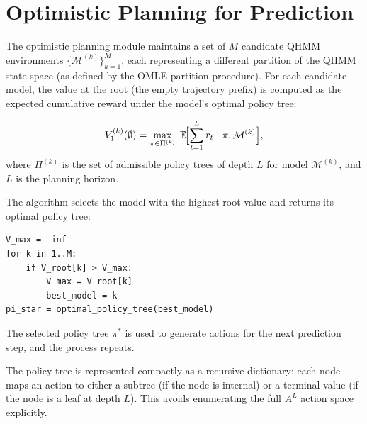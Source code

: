 

\section{Optimistic Planning for Prediction}
\label{sec:optimistic_impl}


The optimistic planning module maintains a set of $M$ candidate QHMM
environments $\{\mathcal{M}^{(k)}\}_{k=1}^M$, each representing a
different partition of the QHMM state space (as defined by the OMLE
partition procedure). For each candidate model, the value at the root
(the empty trajectory prefix) is computed as the expected cumulative
reward under the model's optimal policy tree:

\begin{equation}
V^{(k)}_1(\emptyset) = \max_{\pi \in \Pi^{(k)}} \;
  \mathbb{E}\!\Bigl[\sum_{t=1}^L r_t \;\big|\; \pi, \mathcal{M}^{(k)}\Bigr],
\end{equation}
where $\Pi^{(k)}$ is the set of admissible policy trees of depth $L$
for model $\mathcal{M}^{(k)}$, and $L$ is the planning horizon.


The algorithm selects the model with the highest root value and returns
its optimal policy tree:
\begin{verbatim}
V_max = -inf
for k in 1..M:
    if V_root[k] > V_max:
        V_max = V_root[k]
        best_model = k
pi_star = optimal_policy_tree(best_model)
\end{verbatim}
The selected policy tree $\pi^*$ is used to generate actions for the
next prediction step, and the process repeats.


The policy tree is represented compactly as a recursive dictionary:
each node maps an action to either a subtree (if the node is internal)
or a terminal value (if the node is a leaf at depth $L$). This avoids
enumerating the full $A^L$ action space explicitly.


